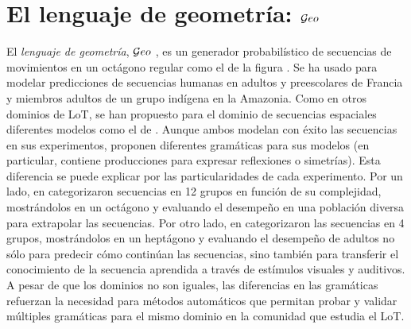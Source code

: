 \section{El lenguaje de geometría: $\mathcal Geo$}


El \textit{lenguaje de geometría}, $\mathcal Geo$ \cite{marie2016}, es un generador probabilístico de secuencias de movimientos en un octágono regular como el de la figura . Se ha usado para modelar predicciones de secuencias humanas en adultos y preescolares de Francia y miembros adultos de un grupo indígena en la Amazonia. Como en otros dominios de LoT, se han propuesto para el dominio de secuencias espaciales diferentes modelos como el de \cite{yildirim2015learning}. Aunque ambos modelan con éxito las secuencias en sus experimentos, proponen diferentes gramáticas para sus modelos (en particular, \cite{marie2016} contiene producciones para expresar reflexiones o simetrías). Esta diferencia se puede explicar por las particularidades de cada experimento. Por un lado, en \cite{marie2016} categorizaron secuencias en 12 grupos en función de su complejidad, mostrándolos en un octágono y evaluando el desempeño en una población diversa para extrapolar las secuencias. Por otro lado, en \cite{yildirim2015learning} categorizaron las secuencias en 4 grupos, mostrándolos en un heptágono y evaluando el desempeño de adultos no sólo para predecir cómo continúan las secuencias, sino también para transferir el conocimiento de la secuencia aprendida a través de estímulos visuales y auditivos. A pesar de que los dominios no son iguales, las diferencias en las gramáticas refuerzan la necesidad para métodos automáticos que permitan probar y validar múltiples gramáticas para el mismo dominio en la comunidad que estudia el LoT.

